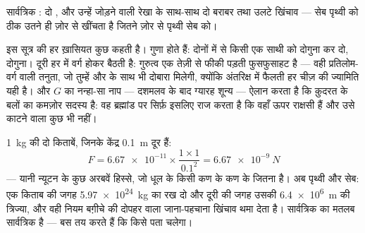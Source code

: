 \begin{omfigure}

{\small सार्वत्रिक : दो , और उन्हें जोड़ने वाली
रेखा के साथ-साथ दो बराबर तथा उलटे खिंचाव --- सेब पृथ्वी को ठीक उतने ही
ज़ोर से खींचता है जितने ज़ोर से पृथ्वी सेब को।}
\end{omfigure}

\begin{example}[नियम को पढ़ना]\label{ex:g9:gravitation:reading}
इस सूत्र की हर ख़ासियत कुछ कहती है।  गुणा होते हैं: दोनों में
से किसी एक साथी को दोगुना कर दो,  दोगुना। दूरी हर में वर्ग होकर
बैठती है: गुरुत्व एक तेज़ी से फीकी पड़ती फुसफुसाहट है --- वही
प्रतिलोम-वर्ग वाली तनुता, जो तुम्हें  और  के साथ भी दोबारा
मिलेगी, क्योंकि अंतरिक्ष में फैलती हर चीज़ की ज्यामिति यही है। और $G$
का नन्हा-सा नाप --- दशमलव के बाद ग्यारह शून्य --- ऐलान करता है कि
 क़ुदरत के बलों का कमज़ोर सदस्य है: वह ब्रह्मांड पर सिर्फ़
इसलिए राज करता है कि वहाँ ऊपर  राक्षसी हैं और उसे काटने वाला
कुछ भी नहीं।
\end{example}

\begin{example}[ताक की किताबें आपस में क्यों नहीं भिड़ जातीं]\label{ex:g9:gravitation:books}
\qty{1}{kg} की दो किताबें, जिनके केंद्र \qty{0.1}{m} दूर हैं:
\[
F = \num{6.67e-11} \times \frac{1 \times 1}{0.1^2}
= \qty{6.67e-9}{N}
\]
--- यानी न्यूटन के कुछ अरबवें हिस्से, जो धूल के किसी कण के कण के 
जितना है। अब पृथ्वी और सेब: एक किताब की जगह \qty{5.97e24}{kg} का 
रख दो और दूरी की जगह उसकी \qty{6.4e6}{m} की त्रिज्या, और वही नियम
बग़ीचे की दोपहर वाला जाना-पहचाना खिंचाव थमा देता है। सार्वत्रिक का
मतलब सार्वत्रिक है --- बस  तय करते हैं कि किसे पता चलेगा।
\end{example}

